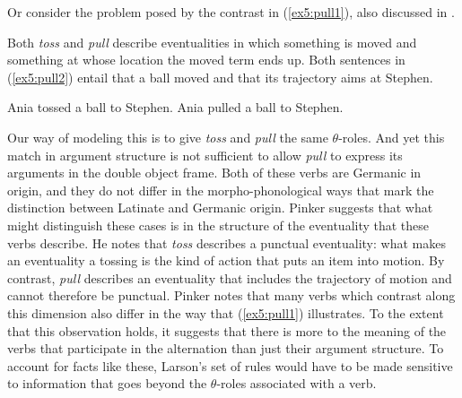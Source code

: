 Or consider the problem posed by the contrast in (\ref{ex5:pull1}), also discussed in \citet[pp. 110-1]{Pinker:1989}.
\begin{exe}
	\raggedright
	\ex \label{ex5:pull1} 
	\begin{xlist}
	\end{xlist}
\end{exe}
Both \emph{toss} and \emph{pull} describe eventualities in which something is moved and something at whose location the moved term ends up. Both sentences in (\ref{ex5:pull2}) entail that a ball moved and that its trajectory aims at Stephen.
\begin{exe}
	\raggedright
	\ex \label{ex5:pull2} 
	\begin{xlist}
		\ex Ania tossed a ball to Stephen.
		\ex Ania pulled a ball to Stephen.
	\end{xlist}
\end{exe}
Our way of modeling this is to give \emph{toss} and \emph{pull} the same $\theta$-roles. And yet this match in argument structure is not sufficient to allow \emph{pull} to express its arguments in the double object frame. Both of these verbs are Germanic in origin, and they do not differ in the morpho-phonological ways that mark the distinction between Latinate and Germanic origin. Pinker suggests that what might distinguish these cases is in the structure of the eventuality that these verbs describe. He notes that \emph{toss} describes a punctual eventuality: what makes an eventuality a tossing is the kind of action that puts an item into motion. By contrast, \emph{pull} describes an eventuality that includes the trajectory of motion and cannot therefore be punctual. Pinker notes that many verbs which contrast along this dimension also differ in the way that (\ref{ex5:pull1}) illustrates.%
%
%
To the extent that this observation holds, it suggests that there is more to the meaning of the verbs that participate in the alternation than just their argument structure. To account for facts like these, Larson's set of rules would have to be made sensitive to information that goes beyond the $\theta$-roles associated with a verb.


